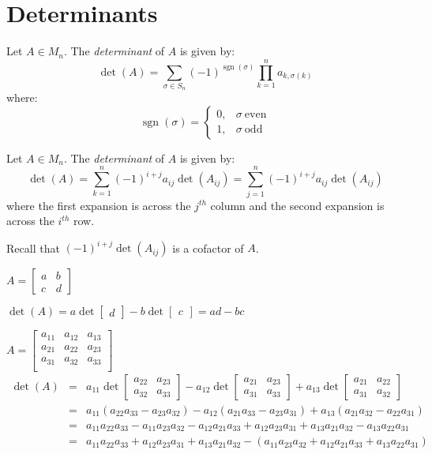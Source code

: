\documentclass[letterpaper,12pt,fleqn]{article}
\renewcommand{\o}{\sigma}
\newcommand{\ms}[1]{\begin{bmatrix} #1 \end{bmatrix}}
\DeclareMathOperator{\sgn}{sgn}
\begin{document}
\section*{Determinants}

\begin{definition}[Determinant]
  Let $A\in M_n$. The \emph{determinant} of $A$ is given by:
  \[\det(A)=\sum_{\o\in S_n}(-1)^{\sgn(\o)}\prod_{k=1}^na_{k,\o(k)}\]
  where:
  \[\sgn(\o)=\begin{cases}
  0, & \o\ \mbox{even} \\
  1, & \o\ \mbox{odd}
  \end{cases}\]
\end{definition}

\begin{definition}
  Let $A\in M_n$. The \emph{determinant} of $A$ is given by:
  \[\det(A)=
  \sum_{k=1}^n(-1)^{i+j}a_{ij}\det(A_{ij})=
  \sum_{j=1}^n(-1)^{i+j}a_{ij}\det(A_{ij})\]
  where the first expansion is across the $j^{th}$ column and the second
  expansion is across the $i^{th}$ row.
\end{definition}

Recall that $(-1)^{i+j}\det(A_{ij})$ is a cofactor of $A$.

\begin{example}
  $A=\begin{bmatrix} a & b \\ c & d \end{bmatrix}$

  $\det(A)=a\det\ms{d}-b\det\ms{c}=ad-bc$

  $A=\begin{bmatrix}
  a_{11} & a_{12} & a_{13} \\
  a_{21} & a_{22} & a_{23} \\
  a_{31} & a_{32} & a_{33} \\
  \end{bmatrix}$
  \begin{eqnarray*}
    \det(A) &=& a_{11}\det\begin{bmatrix} a_{22} & a_{23} \\ a_{32} & a_{33} \end{bmatrix}-
    a_{12}\det\begin{bmatrix} a_{21} & a_{23} \\ a_{31} & a_{33} \end{bmatrix}+
    a_{13}\det\begin{bmatrix} a_{21} & a_{22} \\ a_{31} & a_{32} \end{bmatrix} \\
    &=& a_{11}(a_{22}a_{33}-a_{23}a_{32})-a_{12}(a_{21}a_{33}-a_{23}a_{31})+
    a_{13}(a_{21}a_{32}-a_{22}a_{31}) \\
    &=& a_{11}a_{22}a_{33}-a_{11}a_{23}a_{32}-a_{12}a_{21}a_{33}+a_{12}a_{23}a_{31}+
    a_{13}a_{21}a_{32}-a_{13}a_{22}a_{31} \\
    &=& a_{11}a_{22}a_{33}+a_{12}a_{23}a_{31}+a_{13}a_{21}a_{32}-
    (a_{11}a_{23}a_{32}+a_{12}a_{21}a_{33}+a_{13}a_{22}a_{31})
  \end{eqnarray*}
\end{example}
\end{document}
